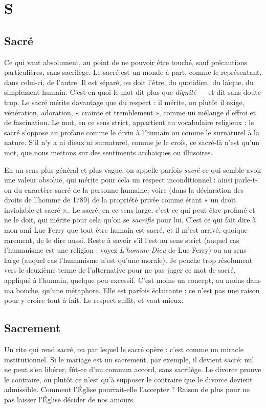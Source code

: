 \chapter{S}

\section{Sacré}
Ce qui vaut absolument, au point de ne pouvoir être touché, sauf
précautions particulières, sans sacrilège. Le sacré est un monde à
part, comme le représentant, dans celui-ci, de l’autre. Il est séparé, ou doit
l'être, du quotidien, du laïque, du simplement humain. C’est en quoi le mot
dit plus que {\it dignité} — et dit sans doute trop. Le sacré mérite davantage que du
respect : il mérite, ou plutôt il exige, vénération, adoration, « crainte et
tremblement », comme un mélange d’effroi et de fascination. Le mot, en ce
sens strict, appartient au vocabulaire religieux : le sacré s'oppose au profane
comme le divin à l’humain ou comme le surnaturel à la nature. S'il n’y a ni
dieux ni surnaturel, comme je le crois, ce sacré-là n’est qu’un mot, que nous
mettons sur des sentiments archaïques ou illusoires.

En un sens plus général et plus vague, on appelle parfois {\it sacré} ce qui
semble avoir une valeur absolue, qui mérite pour cela un respect
inconditionnel : ainsi parle-t-on du caractère sacré de la personne humaine,
voire (dans la déclaration des droits de l’homme de 1789) de la propriété
privée comme étant « un droit inviolable et sacré ».. Le sacré, en ce sens
large, c’est ce qui peut être profané et ne le doit, qui mérite pour cela qu’on
se {\it sacrifie} pour lui. C’est ce qui fait dire à mon ami Luc Ferry que tout être
humain est sacré, et il m'est arrivé, quoique rarement, de le dire aussi. Reste
à savoir s’il l’est au sens strict (auquel cas l’humanisme est une religion :
voyez {\it L'homme-Dieu} de Luc Ferry) ou au sens large (auquel cas l’humanisme
n'est qu’une morale). Je penche trop résolument vers le deuxième terme de
l'alternative pour ne pas juger ce mot de sacré, appliqué à l'humain, quelque
peu excessif. C’est moins un concept, au moins dans ma bouche, qu’une
métaphore. Elle est parfois éclairante ; ce n’est pas une raison pour y croire
tout à fait. Le respect suffit, et vaut mieux.

\section{Sacrement}
Un rite qui rend sacré, ou par lequel le sacré opère : c’est
comme un miracle institutionnel. Si le mariage est un sacrement,
par exemple, il devient sacré: nul ne peut s’en libérer, fût-ce d’un
commun accord, sans sacrilège. Le divorce prouve le contraire, ou plutôt ce
n’est qu’à supposer le contraire que le divorce devient admissible. Comment
l'Église pourrait-elle l’accepter ? Raison de plus pour ne pas laisser l'Église
décider de nos amours.

